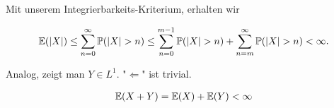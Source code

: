 \begin{solution}
Mit unserem Integrierbarkeits-Kriterium, erhalten wir

\begin{align*}
  \mathbb{E}(|X|)
  \leq
    \sum_{n=0}^\infty \mathbb{P}(|X| > n)
  \leq
    \sum_{n=0}^{m-1} \mathbb{P}(|X| > n) +
    \sum_{n=m}^\infty \mathbb{P}(|X| > n)
  < \infty.
\end{align*}

Analog, zeigt man $Y \in L^1$. "$\Leftarrow$" ist trivial.

\begin{align*}
  \mathbb{E}(X + Y) = \mathbb{E}(X) + \mathbb{E}(Y) < \infty
\end{align*}

\end{solution}
